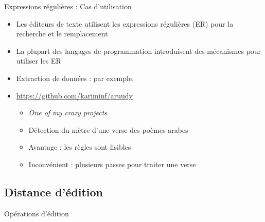 \documentclass{KodeBook}
\begin{document}
Expressions régulières : Cas d'utilisation

\begin{itemize}
	\item Les éditeurs de texte utilisent les expressions régulières (ER) pour la recherche et le remplacement
	\item La plupart des langages de programmation introduisent des mécanismes pour utiliser les ER
	\item Extraction de données : par exemple, 
	\item \url{https://github.com/kariminf/aruudy}
	\begin{itemize}
		\item \textit{One of my crazy projects}
		\item Détection du mètre d'une verse des poèmes arabes
		\item Avantage : les règles sont lisibles
		\item Inconvénient : plusieurs passes pour traiter une verse 
	\end{itemize}
\end{itemize}

\subsection{Distance d'édition}

Opérations d'édition
\end{document}
